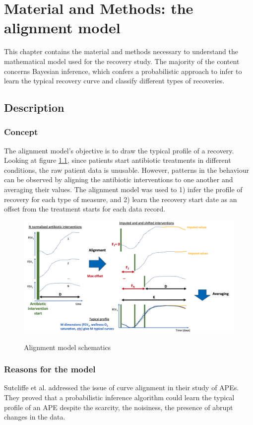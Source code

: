 
\chapter{Material and Methods: the alignment model} \label{sec:model}
This chapter contains the material and methods necessary to understand the mathematical model used for the recovery study. The majority of the content concerns Bayesian inference, which confers a probabilistic approach to infer to learn the typical recovery curve and classify different types of recoveries. 

\section{Description} 
\subsection{Concept} 
The alignment model's objective is to draw the typical profile of a recovery. Looking at figure \ref{fig:schematics}, since patients start antibiotic treatments in different conditions, the raw patient data is unusable. However, patterns in the behaviour can be observed by aligning the antibiotic interventions to one another and averaging their values. The alignment model was used to 1) infer the profile of recovery for each type of measure, and 2) learn the recovery start date as an offset from the treatment starts for each data record.

    \begin{figure}[!h]
    \caption{Alignment model schematics}
    \centering
    \includegraphics[width=150mm]{images/schematics.png}
    \label{fig:schematics}
    \end{figure}

\subsection{Reasons for the model}
Sutcliffe et al. \cite{damian} addressed the issue of curve alignment in their study of APEs. They proved that a probabilistic inference algorithm could learn the typical profile of an APE despite the scarcity, the noisiness, the presence of abrupt changes in the data.

